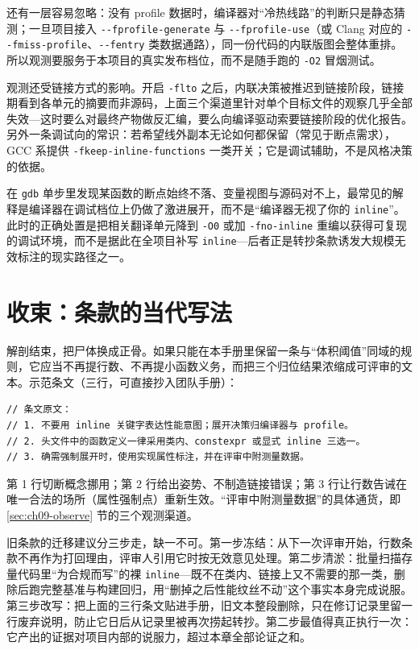 \documentclass[12pt,a4paper,fontset=fandol]{ctexbook}
\newcommand{\Tp}[1]{\texttt{#1}}
\newcommand{\Opt}[1]{\texttt{-\/-#1}}
\begin{document}
还有一层容易忽略：没有 profile 数据时，编译器对``冷热线路''的判断只是静态猜测；一旦项目接入 \Opt{fprofile-generate} 与 \Opt{fprofile-use}（或 Clang 对应的 \Opt{fmiss-profile}、\Opt{fentry} 类数据通路），同一份代码的内联版图会整体重排。所以观测要服务于本项目的真实发布档位，而不是随手跑的 \Tp{-O2} 冒烟测试。

观测还受链接方式的影响。开启 \Tp{-flto} 之后，内联决策被推迟到链接阶段，链接期看到各单元的摘要而非源码，上面三个渠道里针对单个目标文件的观察几乎全部失效---这时要么对最终产物做反汇编，要么向编译驱动索要链接阶段的优化报告。另外一条调试向的常识：若希望线外副本无论如何都保留（常见于断点需求），GCC 系提供 \Tp{-fkeep-inline-functions} 一类开关；它是调试辅助，不是风格决策的依据。

\begin{note}[title={调试现场的``内联假象''}]
在 \Tp{gdb} 单步里发现某函数的断点始终不落、变量视图与源码对不上，最常见的解释是编译器在调试档位上仍做了激进展开，而不是``编译器无视了你的 \Tp{inline}''。此时的正确处置是把相关翻译单元降到 \Tp{-O0} 或加 \Tp{-fno-inline} 重编以获得可复现的调试环境，而不是据此在全项目补写 \Tp{inline}---后者正是转抄条款诱发大规模无效标注的现实路径之一。
\end{note}

\section{收束：条款的当代写法}
\label{sec:ch09-wording}

解剖结束，把尸体换成正骨。如果只能在本手册里保留一条与``体积阈值''同域的规则，它应当不再提行数、不再提小函数义务，而把三个归位结果浓缩成可评审的文本。示范条文（三行，可直接抄入团队手册）：

\begin{guideline}[title={示范条文：关于 inline 与展开的当代条款}]
\begin{lstlisting}[style=cppstyle]
// 条文原文：
// 1. 不要用 inline 关键字表达性能意图；展开决策归编译器与 profile。
// 2. 头文件中的函数定义一律采用类内、constexpr 或显式 inline 三选一。
// 3. 确需强制展开时，使用实现属性标注，并在评审中附测量数据。
\end{lstlisting}
第 1 行切断概念挪用；第 2 行给出姿势、不制造链接错误；第 3 行让行数告诫在唯一合法的场所（属性强制点）重新生效。``评审中附测量数据''的具体通货，即 \ref{sec:ch09-observe} 节的三个观测渠道。
\end{guideline}

旧条款的迁移建议分三步走，缺一不可。第一步冻结：从下一次评审开始，行数条款不再作为打回理由，评审人引用它时按无效意见处理。第二步清淤：批量扫描存量代码里``为合规而写''的裸 \Tp{inline}---既不在类内、链接上又不需要的那一类，删除后跑完整基准与构建回归，用``删掉之后性能纹丝不动''这个事实本身完成说服。第三步改写：把上面的三行条文贴进手册，旧文本整段删除，只在修订记录里留一行废弃说明，防止它日后从记录里被再次捞起转抄。第二步最值得真正执行一次：它产出的证据对项目内部的说服力，超过本章全部论证之和。
\end{document}
